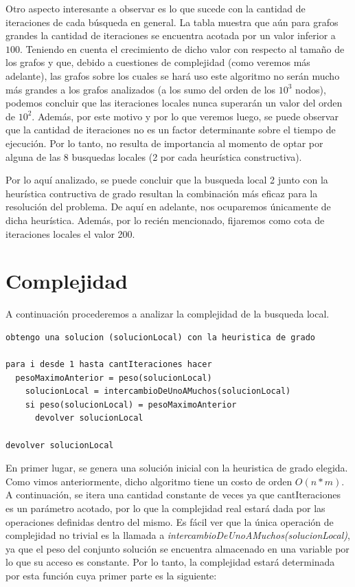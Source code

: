 \documentclass[a4paper,11pt] {article}
\begin{document}
Otro aspecto interesante a observar es lo que sucede con la cantidad de iteraciones de cada búsqueda en general. La tabla muestra que aún para grafos grandes la cantidad de iteraciones se encuentra acotada por un valor inferior a $100$. Teniendo en cuenta el crecimiento de dicho valor con respecto al tamaño de los grafos y que, debido a cuestiones de complejidad (como veremos más adelante), las grafos sobre los cuales se hará uso este algoritmo no serán mucho más grandes a los grafos analizados (a los sumo del orden de los $10^3$ nodos), podemos concluir que las iteraciones locales nunca superarán un valor del orden de $10^2$. Además, por este motivo y por lo que veremos luego, se puede observar que la cantidad de iteraciones no es un factor determinante sobre el tiempo de ejecución. Por lo tanto, no resulta de importancia al momento de optar por alguna de las 8 busquedas locales (2 por cada heurística constructiva).

Por lo aquí analizado, se puede concluir que la busqueda local 2 junto con la heurística contructiva de grado resultan la combinación más eficaz para la resolución del problema. De aquí en adelante, nos ocuparemos únicamente de dicha heurística. Adem\'as, por lo reci\'en mencionado, fijaremos como cota de iteraciones locales el valor 200.

\section*{Complejidad}

A continuación procederemos a analizar la complejidad de la busqueda local.

\begin{verbatim}
obtengo una solucion (solucionLocal) con la heuristica de grado

para i desde 1 hasta cantIteraciones hacer
  pesoMaximoAnterior = peso(solucionLocal)
    solucionLocal = intercambioDeUnoAMuchos(solucionLocal)
    si peso(solucionLocal) = pesoMaximoAnterior
      devolver solucionLocal

devolver solucionLocal
\end{verbatim}

En primer lugar, se genera una solución inicial con la heuristica de grado elegida. Como vimos anteriormente, dicho algoritmo tiene un costo de orden $O(n*m)$. A continuación, se itera una cantidad constante de veces ya que cantIteraciones es un parámetro acotado, por lo que la complejidad real estará dada por las operaciones definidas dentro del mismo. Es fácil ver que la única operación de complejidad no trivial es la llamada a \textit{intercambioDeUnoAMuchos(solucionLocal)}, ya que el peso del conjunto solución se encuentra almacenado en una variable por lo que su acceso es constante. Por lo tanto, la complejidad estará determinada por esta función cuya primer parte es la siguiente:
\end{document}
